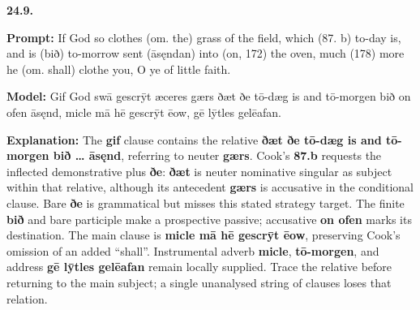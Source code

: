\par\begin{minipage}{\linewidth}\raggedright
\textbf{24.9.}

\textbf{Prompt:} If God so clothes (om. the) grass of the field, which (87. b) to-day is, and is (bið) to-morrow sent (āsęndan) into (on, 172) the oven, much (178) more he (om. shall) clothe you, O ye of little faith.

\textbf{Model:} Gif God swā gescrȳt æceres gærs ðæt ðe tō-dæg is and tō-morgen bið on ofen āsęnd, micle mā hē gescrȳt ēow, gē lȳtles gelēafan.

\textbf{Explanation:} The \textbf{gif} clause contains the relative \textbf{ðæt ðe tō-dæg is and tō-morgen bið … āsęnd}, referring to neuter \textbf{gærs}. Cook’s \textbf{87.b} requests the inflected demonstrative plus \textbf{ðe}: \textbf{ðæt} is neuter nominative singular as subject within that relative, although its antecedent \textbf{gærs} is accusative in the conditional clause. Bare \textbf{ðe} is grammatical but misses this stated strategy target. The finite \textbf{bið} and bare participle make a prospective passive; accusative \textbf{on ofen} marks its destination. The main clause is \textbf{micle mā hē gescrȳt ēow}, preserving Cook’s omission of an added “shall”. Instrumental adverb \textbf{micle}, \textbf{tō-morgen}, and address \textbf{gē lȳtles gelēafan} remain locally supplied. Trace the relative before returning to the main subject; a single unanalysed string of clauses loses that relation.

\end{minipage}\par\addvspace{4pt}


